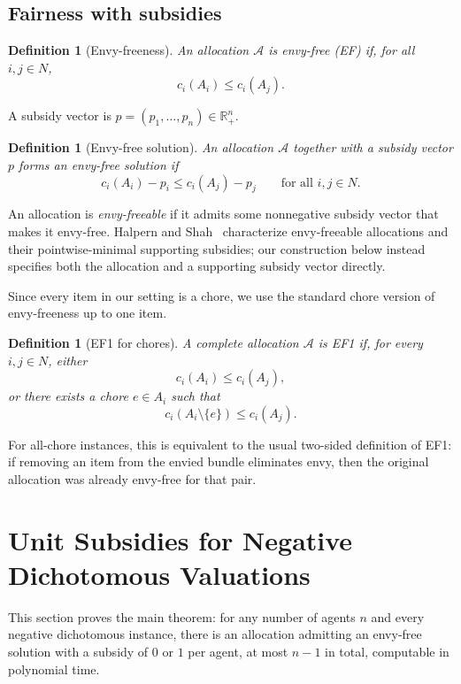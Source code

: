 \documentclass[sigconf,anonymous]{aamas}
\newcommand{\agents}{N}
\newcommand{\alloc}{\mathcal{A}}
\newcommand{\bundle}[1]{A_{#1}}
\newcommand{\subsidy}{p}
\newcommand{\cost}{c}
\newcommand{\R}{\mathbb{R}}
\theoremstyle{acmplain}
\theoremstyle{acmdefinition}
\newtheorem{definition}[theorem]{Definition}
\theoremstyle{acmplain}
\begin{document}
\subsection{Fairness with subsidies}

\begin{definition}[Envy-freeness]
\label{def:ef}
An allocation $\alloc$ is \emph{envy-free} (EF) if, for all
$i,j\in\agents$,
\[
\cost_i(\bundle{i})\le \cost_i(\bundle{j}).
\]
\end{definition}

A subsidy vector is $\subsidy=(\subsidy_1,\ldots,\subsidy_n)\in
\R_+^n$.

\begin{definition}[Envy-free solution]
\label{def:efsolution}
An allocation $\alloc$ together with a subsidy vector $\subsidy$
forms an \emph{envy-free solution} if
\[
\cost_i(\bundle{i})-\subsidy_i
\le
\cost_i(\bundle{j})-\subsidy_j
\qquad\text{for all }i,j\in\agents.
\]
\end{definition}

An allocation is \emph{envy-freeable} if it admits some
nonnegative subsidy vector that makes it envy-free. Halpern and
Shah~\cite{HS19} characterize envy-freeable allocations and their
pointwise-minimal supporting subsidies; our construction below
instead specifies both the allocation and a supporting subsidy
vector directly.

Since every item in our setting is a chore, we use the standard
chore version of envy-freeness up to one item.

\begin{definition}[EF1 for chores]
\label{def:ef1}
\label{def:ef1chores}
A complete allocation $\alloc$ is \emph{EF1} if, for every
$i,j\in\agents$, either
\[
\cost_i(\bundle{i})\le \cost_i(\bundle{j}),
\]
or there exists a chore $e\in\bundle{i}$ such that
\[
\cost_i(\bundle{i}\setminus\{e\})
\le
\cost_i(\bundle{j}).
\]
\end{definition}

For all-chore instances, this is equivalent to the usual two-sided
definition of EF1: if removing an item from the envied bundle
eliminates envy, then the original allocation was already envy-free
for that pair.
\section{Unit Subsidies for Negative Dichotomous Valuations}
\label{sec:main}

This section proves the main theorem: for any number of agents $n$ and every negative dichotomous instance, there is an allocation admitting an envy-free solution with a subsidy of $0$ or $1$ per agent, at most $n-1$ in total, computable in polynomial time. 
\end{document}
